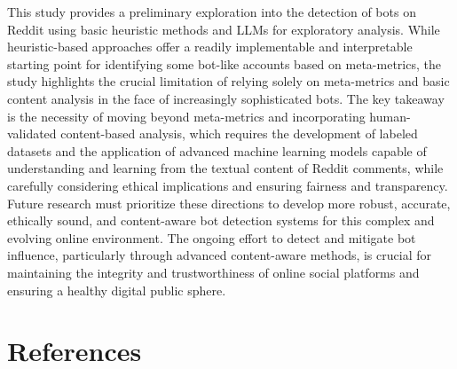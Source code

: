 \documentclass[
  12pt,
  letterpaper,
  DIV=11,
  numbers=noendperiod]{scrartcl}
\begin{document}
This study provides a preliminary exploration into the detection of bots
on Reddit using basic heuristic methods and LLMs for exploratory
analysis. While heuristic-based approaches offer a readily implementable
and interpretable starting point for identifying some bot-like accounts
based on meta-metrics, the study highlights the crucial limitation of
relying solely on meta-metrics and basic content analysis in the face of
increasingly sophisticated bots. The key takeaway is the necessity of
moving beyond meta-metrics and incorporating human-validated
content-based analysis, which requires the development of labeled
datasets and the application of advanced machine learning models capable
of understanding and learning from the textual content of Reddit
comments, while carefully considering ethical implications and ensuring
fairness and transparency. Future research must prioritize these
directions to develop more robust, accurate, ethically sound, and
content-aware bot detection systems for this complex and evolving online
environment. The ongoing effort to detect and mitigate bot influence,
particularly through advanced content-aware methods, is crucial for
maintaining the integrity and trustworthiness of online social platforms
and ensuring a healthy digital public sphere.

\newpage

\section*{References}\label{references}
\end{document}
